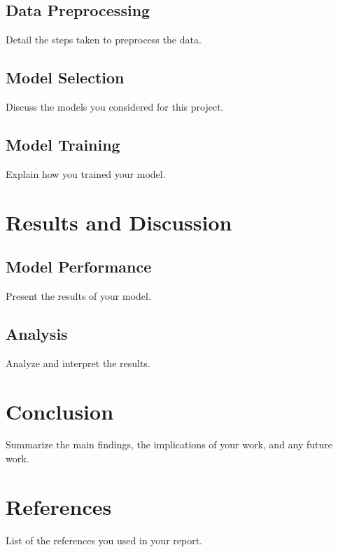 \documentclass[a4paper]{article}
\begin{document}
\subsection{Data Preprocessing}
Detail the steps taken to preprocess the data.

\subsection{Model Selection}
Discuss the models you considered for this project.

\subsection{Model Training}
Explain how you trained your model.

\section{Results and Discussion}
\subsection{Model Performance}
Present the results of your model.

\subsection{Analysis}
Analyze and interpret the results.

\section{Conclusion}
Summarize the main findings, the implications of your work, and any future work.

\section{References}
List of the references you used in your report.
\end{document}
